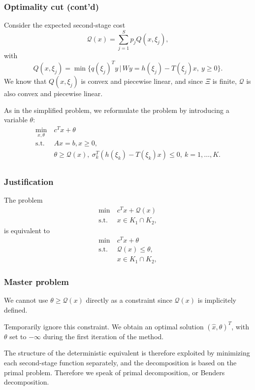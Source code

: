 \documentclass{beamer}
\begin{document}
\begin{frame}
\frametitle{Optimality cut (cont'd)}
	
Consider the expected second-stage cost
\[
\mathcal{Q}(x) = \sum_{j=1}^S p_jQ(x,\xi_j),
\]
with
\[
Q(x,\xi_j) = \min \lbrace q(\xi_j)^Ty \,|\, Wy = h(\xi_j)-T(\xi_j)x,\
y \geq 0 \rbrace.
\]
We know that $Q(x,\xi_j)$ is convex and piecewise linear, and since $\Xi$ is finite, $\mathcal{Q}$ is also convex and piecewise linear.
	
\mbox{}
	
As in the simplified problem, we reformulate the problem by introducing a variable $\theta$:
\begin{align*}
\min_{x,\theta}\ & c^Tx+\theta\\
\mbox{s.t. } & Ax = b, x \geq 0,\\
& \theta \geq \mathcal{Q}(x),\ 
\sigma_k^T(h(\xi_k)-T(\xi_k)x) \leq 0,\ k = 1,\ldots,K.\\
\end{align*}
	
\end{frame}

\begin{frame}
\frametitle{Justification}
	
The problem
	\begin{align*}
	\min\ & c^Tx + \mathcal{Q}(x) \\
	\mbox{s.t. } & x \in K_1 \cap K_2,
	\end{align*}
is equivalent to
	\begin{align*}
	\min\ & c^Tx + \theta \\
	\mbox{s.t. } & \mathcal{Q}(x) \leq \theta, \\
	& x \in K_1 \cap K_2,
	\end{align*}
	
\end{frame}

\begin{frame}
\frametitle{Master problem}

We cannot use $\theta \geq \mathcal{Q}(x)$ directly as a constraint since $\mathcal{Q}(x)$ is implicitely defined.
	
\mbox{}
	
{\blue Temporarily ignore} this constraint.
We obtain an optimal solution $(\hat{x}, \theta)^T$, with $\theta$ set to $-\infty$ during the first iteration of the method.
	
\mbox{}

The structure of the deterministic equivalent is therefore exploited by minimizing each second-stage function separately, and the decomposition is based on the primal problem.
Therefore we speak of primal decomposition, or Benders decomposition.	
	
\end{frame}
\end{document}
